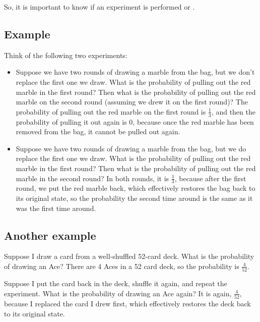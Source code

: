 \documentclass[../../../main.tex]{subfiles}
\begin{document}
\noindent
So, it is important to know if an experiment is performed  or .


\subsection{Example}

Think of the following two experiments:

\begin{itemize}

  \item Suppose we have two rounds of drawing a marble from the bag, but we don't replace the first one we draw. What is the probability of pulling out the red marble in the first round? Then what is the probability of pulling out the red marble on the second round (assuming we drew it on the first round)? The probability of pulling out the red marble on the first round is $\frac{1}{3}$, and then the probability of pulling it out again is 0, because once the red marble has been removed from the bag, it cannot be pulled out again. 
  
  \item Suppose we have two rounds of drawing a marble from the bag, but we do replace the first one we draw. What is the probability of pulling out the red marble in the first round? Then what is the probability of pulling out the red marble in the second round? In both rounds, it is $\frac{1}{3}$, because after the first round, we put the red marble back, which effectively restores the bag back to its original state, so the probability the second time around is the same as it was the first time around.

\end{itemize}


\subsection{Another example}

Suppose I draw a card from a well-shuffled 52-card deck. What is the probability of drawing an Ace? There are 4 Aces in a 52 card deck, so the probability is $\frac{4}{52}$. 

Suppose I put the card back in the deck, shuffle it again, and repeat the experiment. What is the probability of drawing an Ace again? It is again, $\frac{4}{52}$, because I replaced the card I drew first, which effectively restores the deck back to its original state.
\end{document}
